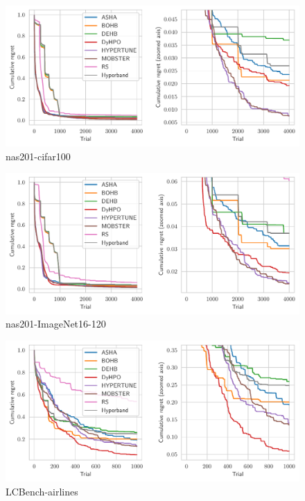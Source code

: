 \begin{figure}[H]
    \centering
    \includegraphics[scale=0.58]{img/tabular_exp/nas201-cifar100_plot.pdf}
    \caption{nas201-cifar100}
\end{figure}

\begin{figure}[H]
    \centering
    \includegraphics[scale=0.58]{img/tabular_exp/nas201-ImageNet16-120_plot.pdf}
    \caption{nas201-ImageNet16-120}
\end{figure}

\begin{figure}[H]
    \centering
    \includegraphics[scale=0.58]{img/tabular_exp/lcbench-airlines_plot.pdf}
    \caption{LCBench-airlines}
\end{figure}

